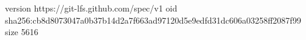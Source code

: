 version https://git-lfs.github.com/spec/v1
oid sha256:cb8d8073047a0b37b14d2a7f663ad97120d5e9edfd31dc606a03258ff2087f99
size 5616
